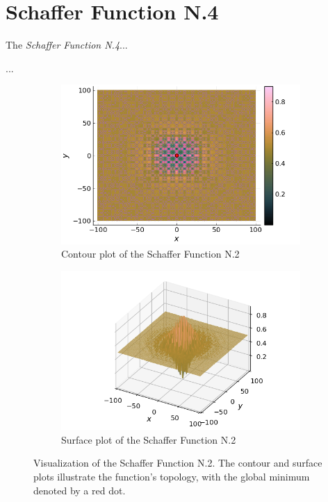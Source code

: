 \section{Schaffer Function N.4}
  The \emph{Schaffer Function N.4}...

  \begin{definition}
    ...
  \end{definition}

    \begin{figure}[ht!]
    \centering
    \begin{subfigure}[b]{0.45\textwidth}
      \centering
      \includegraphics[width=\textwidth]
        {img/test_functions/schaffer_2_contour.png}
      \caption{Contour plot of the Schaffer Function N.2}
    \end{subfigure}
    \hfill
    \begin{subfigure}[b]{0.45\textwidth}
      \centering
      \includegraphics[width=\textwidth]
        {img/test_functions/schaffer_2_surface.png}
      \caption{Surface plot of the Schaffer Function N.2}
    \end{subfigure}
    \caption{
      Visualization of the Schaffer Function N.2.
      The contour and surface plots illustrate the function's topology, with the
      global minimum denoted by a red dot.
    }
    \label{fig:app:test:schaffer_2}
  \end{figure}
